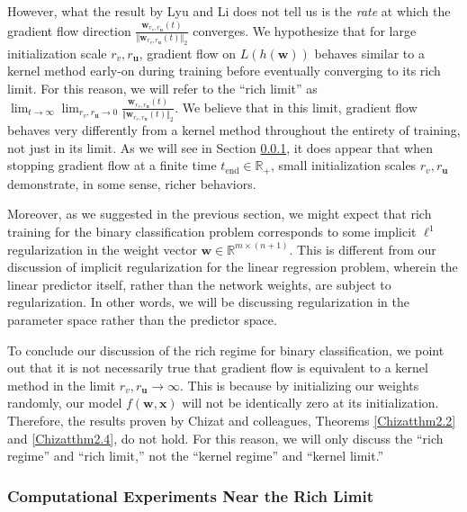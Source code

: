 \documentclass{article}
\begin{document}
However, what the result by Lyu and Li does not tell us is the \textit{rate} at which the gradient flow direction $\frac{\boldsymbol{w}_{r_v, r_{\boldsymbol{u}}}(t)}{\Vert \boldsymbol{w}_{r_v, r_{\boldsymbol{u}}}(t) \Vert_2}$ converges. We hypothesize that for large initialization scale $r_v, r_{\boldsymbol{u}}$, gradient flow on $L(h(\boldsymbol{w}))$ behaves similar to a kernel method early-on during training before eventually converging to its rich limit. For this reason, we will refer to the \enquote{rich limit} as $\lim_{t \to \infty} \lim_{r_v, r_{\boldsymbol{u}} \to 0} \frac{\boldsymbol{w}_{r_v, r_{\boldsymbol{u}}}(t)}{\Vert \boldsymbol{w}_{r_v, r_{\boldsymbol{u}}}(t) \Vert_2}$. We believe that in this limit, gradient flow behaves very differently from a kernel method throughout the entirety of training, not just in its limit. As we will see in Section \ref{logregcomputation}, it does appear that when stopping gradient flow at a finite time $t_{\text{end}} \in \mathbb{R}_+$, small initialization scales $r_v, r_{\boldsymbol{u}}$ demonstrate, in some sense, richer behaviors.

Moreover, as we suggested in the previous section, we might expect that rich training for the binary classification problem corresponds to some implicit $\ell^1$ regularization in the weight vector $\boldsymbol{w} \in \mathbb{R}^{m \times (n+1)}$. This is different from our discussion of implicit regularization for the linear regression problem, wherein the linear predictor itself, rather than the network weights, are subject to regularization. In other words, we will be discussing regularization in the parameter space rather than the predictor space.

To conclude our discussion of the rich regime for binary classification, we point out that it is not necessarily true that gradient flow is equivalent to a kernel method in the limit $r_v, r_{\boldsymbol{u}} \rightarrow \infty$. This is because by initializing our weights randomly, our model $f(\boldsymbol{w}, \boldsymbol{x})$ will not be identically zero at its initialization. Therefore, the results proven by Chizat and colleagues, Theorems \ref{Chizatthm2.2} and \ref{Chizatthm2.4}, do not hold. For this reason, we will only discuss the \enquote{rich regime} and \enquote{rich limit,} not the \enquote{kernel regime} and \enquote{kernel limit.}


\subsubsection{Computational Experiments Near the Rich Limit}\label{logregcomputation}
\end{document}
